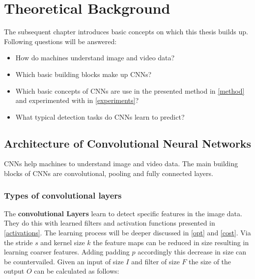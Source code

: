 


\chapter{Theoretical Background} %

\label{theory} %
The subsequent chapter introduces basic concepts on which this thesis builds up.
Following questions will be answered:

\begin{itemize}
    \item How do machines understand image and video data?
    \item Which basic building blocks make up \glspl{CNN}?
    \item Which basic concepts of \glspl{CNN} are use in the presented method in \autoref{method} and experimented with in \autoref{experiments}?
    \item What typical detection tasks do \glspl{CNN} learn to predict?

\end{itemize}


\section{Architecture of Convolutional Neural Networks}
\glspl{CNN} help machines to understand image and video data.
The main building blocks of \glspl{CNN} are convolutional, pooling and fully connected layers.
\subsection{Types of convolutional layers}
The \textbf{convolutional Layers} learn to detect specific features in the image data.
They do this with learned filters and activation functions presented in \autoref{activations}.
The learning process will be deeper discussed in \autoref{opt} and \autoref{cost}.
Via the stride $s$ and kernel size $k$ the feature maps can be reduced in size resulting in
learning coarser features.
Adding padding $p$ accordingly this decrease in size can be countervailed.
Given an input of size $I$ and filter of size $F$ the size of the output $O$ can be calculated as follows:


